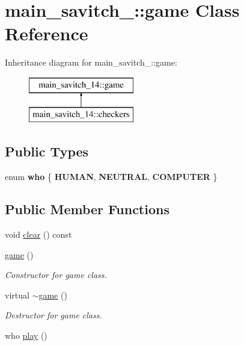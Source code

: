 \hypertarget{classmain__savitch__14_1_1game}{}\section{main\+\_\+savitch\+\_\+:\+:game Class Reference}
\label{classmain__savitch__14_1_1game}
Inheritance diagram for main\+\_\+savitch\+\_\+:\+:game\+:\begin{figure}[H]
\begin{center}
\leavevmode
\includegraphics[height=2.000000cm]{classmain__savitch__14_1_1game}
\end{center}
\end{figure}
\subsection*{Public Types}
\begin{DoxyCompactItemize}
\item 
enum {\bfseries who} \{ {\bfseries H\+U\+M\+AN}, 
{\bfseries N\+E\+U\+T\+R\+AL}, 
{\bfseries C\+O\+M\+P\+U\+T\+ER}
 \}\hypertarget{classmain__savitch__14_1_1game_a4fe20fb287f809ae2b68e28e4ccba634}{}\label{classmain__savitch__14_1_1game_a4fe20fb287f809ae2b68e28e4ccba634}

\end{DoxyCompactItemize}
\subsection*{Public Member Functions}
\begin{DoxyCompactItemize}
\item 
void \hyperlink{classmain__savitch__14_1_1game_a99ec2ee1d875b51cea7b052f2c7a6b12}{clear} () const 
\item 
\hyperlink{classmain__savitch__14_1_1game_a65afffa6f5aa8dcd781ad38f898130e0}{game} ()
\begin{DoxyCompactList}\small\item\em Constructor for game class. \end{DoxyCompactList}\item 
virtual \hyperlink{classmain__savitch__14_1_1game_a5e8d21d1d658a12db6fddacca3490671}{$\sim$game} ()\hypertarget{classmain__savitch__14_1_1game_a5e8d21d1d658a12db6fddacca3490671}{}\label{classmain__savitch__14_1_1game_a5e8d21d1d658a12db6fddacca3490671}

\begin{DoxyCompactList}\small\item\em Destructor for game class. \end{DoxyCompactList}\item 
who \hyperlink{classmain__savitch__14_1_1game_a4dbeaddb78059f7c5dcbf5cc4e026317}{play} ()
\end{DoxyCompactItemize}
